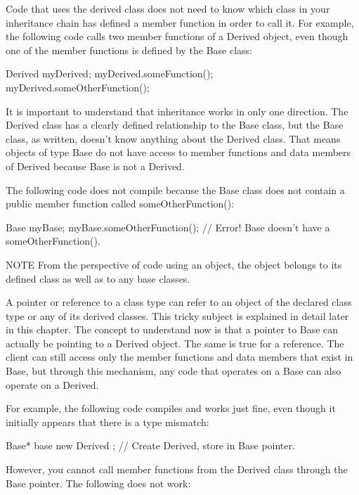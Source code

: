 Code that uses the derived class does not need to know which class in your inheritance chain has defined a member function in order to call it. For example, the following code calls two member functions of a Derived object, even though one of the member functions is defined by the Base class:

\begin{cpp}
Derived myDerived;
myDerived.someFunction();
myDerived.someOtherFunction();
\end{cpp}

It is important to understand that inheritance works in only one direction. The Derived class has a clearly defined relationship to the Base class, but the Base class, as written, doesn’t know anything about the Derived class. That means objects of type Base do not have access to member functions and data members of Derived because Base is not a Derived.

The following code does not compile because the Base class does not contain a public member function called someOtherFunction():

\begin{cpp}
Base myBase;
myBase.someOtherFunction(); // Error! Base doesn't have a someOtherFunction().
\end{cpp}

\begin{myNotic}{NOTE}
From the perspective of code using an object, the object belongs to its defined class as well as to any base classes.
\end{myNotic}

A pointer or reference to a class type can refer to an object of the declared class type or any of its derived classes. This tricky subject is explained in detail later in this chapter. The concept to understand now is that a pointer to Base can actually be pointing to a Derived object. The same is true for a reference. The client can still access only the member functions and data members that exist in Base, but through this mechanism, any code that operates on a Base can also operate on a Derived.

For example, the following code compiles and works just fine, even though it initially appears that there is a type mismatch:

\begin{cpp}
Base* base { new Derived {} }; // Create Derived, store in Base pointer.
\end{cpp}

However, you cannot call member functions from the Derived class through the Base pointer. The following does not work:

